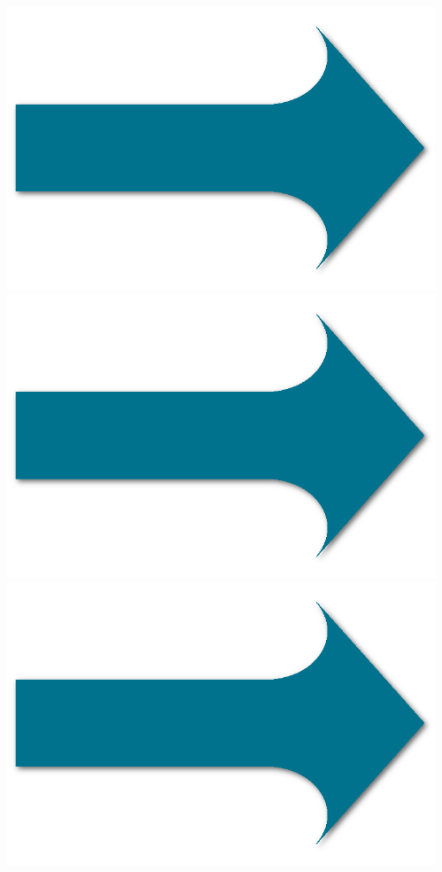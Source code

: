 \documentclass[xcolor=pdftex,dvipsnames,table]{beamer}
\begin{document}
\begin{frame}
\begin{columns}
\begin{column}{0.25\textwidth}
		\end{column}
		\begin{column}{0.05\textwidth}
			\\
			\includegraphics[width=1\textwidth]{arrow.png}\\
			\includegraphics[width=1\textwidth]{arrow.png}\\
			\includegraphics[width=1\textwidth]{arrow.png}\\

\end{column}
\end{columns}
\end{frame}
\end{document}
